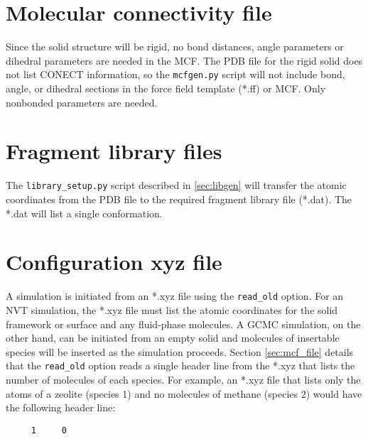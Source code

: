 \section{Molecular connectivity file}\label{sec:solid_mcf}
Since the solid structure will be rigid, no bond distances, angle parameters or dihedral parameters are needed in the MCF.
The PDB file for the rigid solid does not list CONECT information, so the \texttt{mcfgen.py} script will not include bond, 
angle, or dihedral sections in the force field template (*.ff) or MCF. Only nonbonded parameters are needed.

\section{Fragment library files}\label{sec:fragment file}
The \texttt{library\_setup.py} script described in \ref{sec:libgen} will transfer the atomic coordinates 
from the PDB file to the required fragment library file (*.dat). 
The *.dat will list a single conformation.

\section{Configuration xyz file}\label{sec:solid_xyz}
A simulation is initiated from an *.xyz file using the \texttt{read\_old} option. 
For an NVT simulation, the *.xyz file must list the atomic coordinates for 
the solid framework or surface and any fluid-phase molecules. 
A GCMC simulation, on the other hand, can be initiated from an empty solid and molecules 
of insertable species will be inserted as the simulation proceeds. Section \ref{sec:mcf_file}
details that the \texttt{read\_old} option reads a single header line from the *.xyz that lists the number of 
molecules of each species. For example, an *.xyz file that lists only the atoms of a zeolite (species 1) and 
no molecules of methane (species 2) would have the following header line:

\texttt{
\ \ \ \ 1\ \ \ \ \ 0
}
